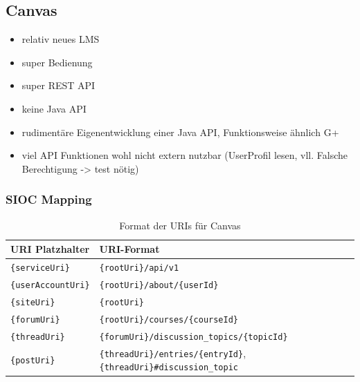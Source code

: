 



\subsection{Canvas} %
\label{sub:canvas_connector}

\begin{itemize}
    \item relativ neues LMS
    \item super Bedienung
    \item super REST API
    \item keine Java API
    \item rudimentäre Eigenentwicklung einer Java API, Funktionsweise ähnlich  G+
    \item viel API Funktionen wohl nicht extern nutzbar (UserProfil lesen, vll. Falsche Berechtigung -> test nötig)
\end{itemize}

\subsubsection{SIOC Mapping} %
\label{ssub:canvas_sioc_mapping}

\begin{table}[h]
    \centering
    \caption{Format der URIs für Canvas}
    \begin{tabular}{l|p{11cm}}
        \textbf{URI Platzhalter} & URI-Format \\ 
        \hline
        \texttt{\{serviceUri\}} & 
        \texttt{\{rootUri\}/api/v1} \\

        \texttt{\{userAccountUri\}} & 
        \texttt{\{rootUri\}/about/\{userId\}} \\

        \texttt{\{siteUri\}} & 
        \texttt{\{rootUri\}} \\

        \texttt{\{forumUri\}} & 
        \texttt{\{rootUri\}/courses/\{courseId\}} \\

        \texttt{\{threadUri\}} & 
        \texttt{\{forumUri\}/discussion\_topics/\{topicId\}} \\

        \texttt{\{postUri\}} & 
        \texttt{\{threadUri\}/entries/\{entryId\}}, \texttt{\{threadUri\}\#discussion\_topic} \\
    \end{tabular}
    \label{tbl:canvas_uri_platzhalter}
\end{table}


